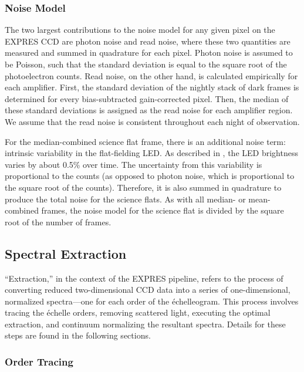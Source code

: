 \subsubsection{Noise Model}
\label{pipeline:noise-model}

The two largest contributions to the noise model for any given pixel on the EXPRES CCD are photon noise and read noise, where these two quantities are measured and summed in quadrature for each pixel. Photon noise is assumed to be Poisson, such that the standard deviation is equal to the square root of the photoelectron counts. Read noise, on the other hand, is calculated empirically for each amplifier. First, the standard deviation of the nightly stack of dark frames is determined for every bias-subtracted gain-corrected pixel. Then, the median of these standard deviations is assigned as the read noise for each amplifier region. We assume that the read noise is consistent throughout each night of observation.

For the median-combined science flat frame, there is an additional noise term: intrinsic variability in the flat-fielding LED. As described in \citet{blackman_performance_2020}, the LED brightness varies by about 0.5\% over time. The uncertainty from this variability is proportional to the counts (as opposed to photon noise, which is proportional to the square root of the counts).  Therefore, it is also summed in quadrature to produce the total noise for the science flats. As with all median- or mean-combined frames, the noise model for the science flat is divided by the square root of the number of frames.

\subsection{Spectral Extraction}
\label{pipeline:extraction}

``Extraction,'' in the context of the EXPRES pipeline, refers to the process of converting reduced two-dimensional CCD data into a series of one-dimensional, normalized spectra---one for each order of the \'echelleogram. This process involves tracing the \'echelle orders, removing scattered light, executing the optimal extraction, and continuum normalizing the resultant spectra. Details for these steps are found in the following sections.

\subsubsection{Order Tracing}
\label{pipeline:order-tracing}

